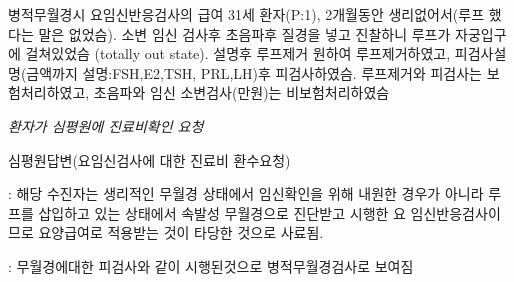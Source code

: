 \par
\medskip
\begin{commentbox}{병적무월경시 요임신반응검사의 급여}
31세 환자(P:1), 2개월동안 생리없어서(루프 했다는 말은 없었슴). 소변 임신 검사후 초음파후 질경을 넣고 진찰하니 루프가 자궁입구에 걸쳐있었슴 (totally out state). 설명후 루프제거 원하여 루프제거하였고, 피검사설명(금액까지 설명:FSH,E2,TSH, PRL,LH)후 피검사하였슴. 루프제거와 피검사는 보험처리하였고, 초음파와 임신 소변검사(만원)는 비보험처리하였슴\par

\begin{center}\emph{환자가 심평원에 진료비확인 요청}\end{center}\par
심평원답변(요임신검사에 대한 진료비 환수요청) \par
: 해당 수진자는 생리적인 무월경 상태에서 임신확인을 위해 내원한 경우가 아니라 루프를 삽입하고 있는 상태에서 속발성 무월경으로 진단받고 시행한 요 임신반응검사이므로 요양급여로 적용받는 것이 타당한 것으로 사료됨. \par
: 무월경에대한 피검사와 같이 시행된것으로 병적무월경검사로 보여짐
\end{commentbox}

